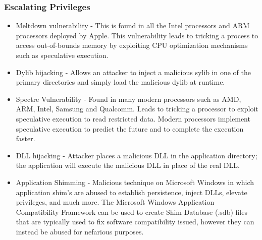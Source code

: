 \subsubsection{Escalating Privileges}
\begin{itemize}
    \item Meltdown vulnerability - This is found in all the Intel processors and ARM processors deployed by Apple. This vulnerability leads to tricking a process to access out-of-bounds memory by exploiting CPU optimization mechanisms such as speculative execution.
    \item Dylib hijacking - Allows an attacker to inject a malicious sylib in one of the primary directories and simply load the malicious dylib at runtime.
    \item Spectre Vulnerability - Found in many modern processors such as AMD, ARM, Intel, Samsung and Qualcomm. Leads to tricking a processor to exploit speculative execution to read restricted data. Modern processors implement speculative execution to predict the future and to complete the execution faster.
    \item DLL hijacking - Attacker places a malicious DLL in the application directory; the application will execute the malicious DLL in place of the real DLL.
    \item Application Shimming - Malicious technique on Microsoft Windows in which application shim's are abused to establish persistence, inject DLLs, elevate privileges, and much more. The Microsoft Windows Application Compatibility Framework can be used to create Shim Database (.sdb) files that are typically used to fix software compatibility issued, however they can instead be abused for nefarious purposes.
\end{itemize}
